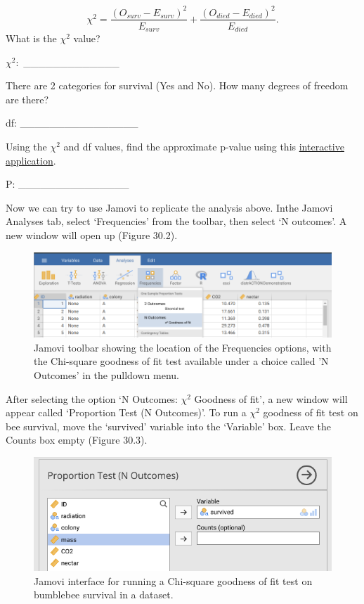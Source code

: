 \documentclass[
]{scrbook}
\begin{document}
\[\chi^{2} = \frac{(O_{surv} - E_{surv})^{2}}{E_{surv}} + \frac{(O_{died} - E_{died})^{2}}{E_{died}}.\]
What is the \(\chi^{2}\) value?

\(\chi^{2}:\) \_\_\_\_\_\_\_\_\_\_\_\_\_

There are 2 categories for survival (Yes and No).
How many degrees of freedom are there?

df: \_\_\_\_\_\_\_\_\_\_\_\_\_\_\_\_

Using the \(\chi^{2}\) and df values, find the approximate p-value using this \href{https://bradduthie.shinyapps.io/chi-square/}{interactive application}.

P: \_\_\_\_\_\_\_\_\_\_\_\_\_\_\_

Now we can try to use Jamovi to replicate the analysis above.
Inthe Jamovi Analyses tab, select `Frequencies' from the toolbar, then select `N outcomes'.
A new window will open up (Figure 30.2).

\begin{figure}
\includegraphics[width=1\linewidth]{img/jamovi_goodness_of_fit_toolbar} \caption{Jamovi toolbar showing the location of the Frequencies options, with the Chi-square goodness of fit test available under a choice called 'N Outcomes' in the pulldown menu.}\label{fig:unnamed-chunk-151}
\end{figure}

After selecting the option `N Outcomes: \(\chi^{2}\) Goodness of fit', a new window will appear called `Proportion Test (N Outcomes)'.
To run a \(\chi^{2}\) goodness of fit test on bee survival, move the `survived' variable into the `Variable' box.
Leave the Counts box empty (Figure 30.3).

\begin{figure}
\includegraphics[width=1\linewidth]{img/jamovi_goodness_of_fit_interface} \caption{Jamovi interface for running a Chi-square goodness of fit test on bumblebee survival in a dataset.}\label{fig:unnamed-chunk-152}
\end{figure}
\end{document}
